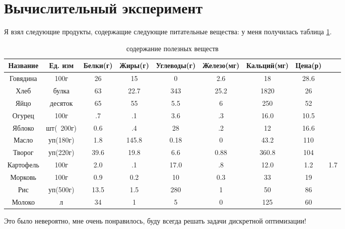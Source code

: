 \documentclass[]{article}
\begin{document}
\section{Вычислительный эксперимент}
Я взял следующие продукты, содержащие следующие питательные вещества:
у меня получилась таблица \ref{tab:1}.
\begin{table}[ht]\caption{содержание полезных веществ}\label{tab:1}
\centering
\begin{tabular}{|c|c|c|c|c|c|c|c|c|}
\hline
Название & Ед. изм & Белки(г) & Жиры(г) & Углеводы(г) & Железо(мг) & Кальций(мг) & Цена(р)\\
\hline
Говядина & 100г & 26 & 15 & 0 & 2.6 & 18 & 28.6\\
\hline
Хлеб & булка & 63 & 22.7& 343 & 25.2 & 1820 & 26\\
\hline
Яйцо & десяток & 65 & 55 & 5.5 & 6 & 250 & 52\\
\hline
Огурец & 100г & .7 & .1 & 3.6 & .3 & 16.0 & 10.5\\
\hline
Яблоко & шт(~200г) & 0.6 & .4 & 28 & .2 & 12 & 16.6\\
\hline
Масло & уп(180г) & 1.8 & 145.8 & 0.18 & 0 & 43.2 & 110\\
\hline
Творог & уп(220г) & 39.6 & 19.8 & 6.6 & 0.88 & 360.8 & 104\\
\hline
Картофель & 100г & 2.0 & .1 & 17.0 & .8 & 12.0 & 1.2 & 1.7\\
\hline
Морковь & 100г & 0.9 & 0.2 & 10 & 0.3 & 33 & 19\\
\hline
Рис & уп(500г) & 13.5 & 1.5 & 280 & 1 & 50 &86\\
\hline
Молоко & л & 34 & 1 & 5 & 0 &125 & 60\\
\hline
\end{tabular}
\end{table}


Это было невероятно, мне очень понравилось, буду всегда решать задачи дискретной оптимизации!
\end{document}
